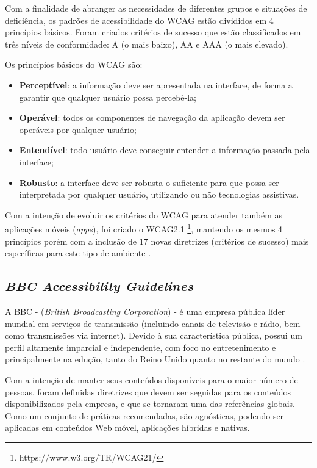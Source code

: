 Com a finalidade de abranger as necessidades de diferentes grupos e situações de deficiência, os padrões de acessibilidade do WCAG estão divididos em 4 princípios básicos. Foram criados critérios de sucesso que estão classificados em três níveis de conformidade: A (o mais baixo), AA e AAA (o mais elevado).

Os princípios básicos do WCAG são:

\begin{itemize}
	\item \textbf{Perceptível}: a informação deve ser apresentada na interface, de forma a garantir que qualquer usuário possa percebê-la;
	\item \textbf{Operável}: todos os componentes de navegação da aplicação devem ser operáveis por qualquer usuário;
	\item \textbf{Entendível}: todo usuário deve conseguir entender a informação passada pela interface;
	\item \textbf{Robusto}: a interface deve ser robusta o suficiente para que possa ser interpretada por qualquer usuário, utilizando ou não tecnologias assistivas.
\end{itemize}

Com a intenção de evoluir os critérios do WCAG para atender também as aplicações móveis (\textit{apps}), foi criado o WCAG2.1 \footnote{https://www.w3.org/TR/WCAG21/}, mantendo os mesmos 4 princípios porém com a inclusão de 17 novas diretrizes (critérios de sucesso) mais específicas para este tipo de ambiente \cite{shanley}.


\subsection{\textit{BBC Accessibility Guidelines}}
A BBC - (\textit{British Broadcasting Corporation}) \cite{bbc} - é uma empresa pública líder mundial em serviços de transmissão (incluindo canais de televisão e rádio, bem como transmissões via internet). Devido à sua característica pública, possui um perfil altamente imparcial e independente, com foco no entretenimento e principalmente na edução, tanto do Reino Unido quanto no restante do mundo \cite{bbchomepage}.

Com a intenção de manter seus conteúdos disponíveis para o maior número de pessoas, foram definidas diretrizes que devem ser seguidas para os conteúdos disponibilizados pela empresa, e que se tornaram uma das referências globais. Como um conjunto de práticas recomendadas, são agnósticas, podendo ser aplicadas em conteúdos Web móvel, aplicações híbridas e nativas.

